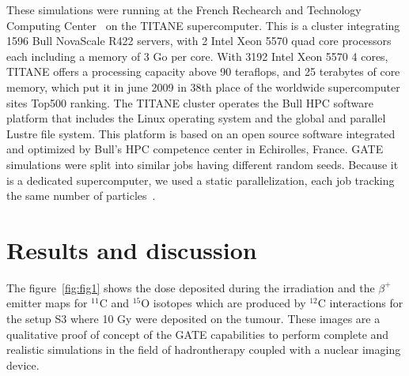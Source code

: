 \documentclass[11pt]{iopart}
\begin{document}
These simulations were running at the French Rechearch and Technology
Computing Center~\cite{CCRT} on the TITANE supercomputer. This is a
cluster integrating 1596 Bull NovaScale R422 servers, with 2 Intel
Xeon 5570 quad core processors each including a memory of 3 Go per
core. With 3192 Intel Xeon 5570 4 cores, TITANE offers a processing
capacity above 90 teraflops, and 25 terabytes of core memory, which
put it in june 2009 in 38th place of the worldwide supercomputer sites
Top500 ranking. The TITANE cluster operates the Bull HPC software
platform that includes the Linux operating system and the global and
parallel Lustre file system. This platform is based on an open source
software integrated and optimized by Bull's HPC competence center in
Echirolles, France. GATE simulations were split into similar jobs
having different random seeds. Because it is a dedicated
supercomputer, we used a static parallelization, each job tracking the
same number of particles~\cite{Camarasu-Pop2010}.

\section{Results and discussion}



The figure~\ref{fig:fig1} shows the dose deposited during the
irradiation and the $\beta^+$ emitter maps for $^{11}$C and $^{15}$O
isotopes which are produced by $^{12}$C interactions for the setup S3
where 10 Gy were deposited on the tumour. These images are a
qualitative proof of concept of the GATE capabilities to perform
complete and realistic simulations in the field of hadrontherapy
coupled with a nuclear imaging device.
\end{document}
